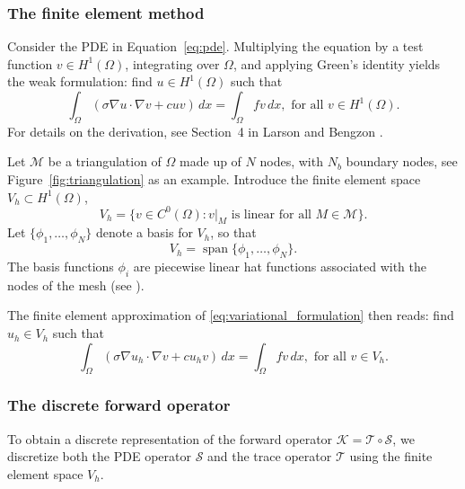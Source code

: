 \subsubsection{The finite element method}

Consider the PDE in Equation~\eqref{eq:pde}. Multiplying the equation by a test function $v \in H^1(\Omega)$, integrating over $\Omega$, and applying Green's identity yields the weak formulation: find $u \in H^1(\Omega)$ such that
\begin{equation}\label{eq:variational_formulation}
    \int_{\Omega} (\sigma \nabla u \cdot \nabla v + c u v) \, dx = \int_{\Omega} f v \, dx,
    \text{ for all } v \in H^1(\Omega).
\end{equation}
For details on the derivation, see Section~4 in Larson and Bengzon \cite{larsonFiniteElementMethod2013}.

Let $\mathcal M$ be a triangulation of $\Omega$ made up of $N$ nodes, with $N_b$ boundary nodes, see Figure~\ref{fig:triangulation} as an example. Introduce the finite element space $V_h \subset H^1(\Omega)$,
\begin{equation}\label{eq:fem_space}
    V_h = \{v \in C^0(\Omega) : v|_M \text{ is linear for all } M \in \mathcal M \}.
\end{equation}
Let $\{\phi_1, \dots, \phi_N\}$ denote a basis for $V_h$, so that
\begin{equation*}
    V_h = \operatorname{span}\{ \phi_1, \dots, \phi_N \}.
\end{equation*}
The basis functions $\phi_i$ are piecewise linear hat functions associated with the nodes of the mesh (see \cite[p.~51]{larsonFiniteElementMethod2013}).
%
%
%
%
%

The finite element approximation of \eqref{eq:variational_formulation} then reads: 
find $u_h \in V_h$ such that
 \begin{equation}\label{eq:fem_formulation}
    \int_{\Omega} (\sigma \nabla u_h \cdot \nabla v + c u_h v) \, dx = \int_{\Omega} f v \, dx,
    \text{ for all } v \in V_h.
\end{equation}


\subsubsection{The discrete forward operator}
To obtain a discrete representation of the forward operator 
$\mathcal{K} = \mathcal{T} \circ \mathcal{S}$, 
we discretize both the PDE operator $\mathcal{S}$ and the trace operator $\mathcal{T}$ using the finite element space $V_h$.

